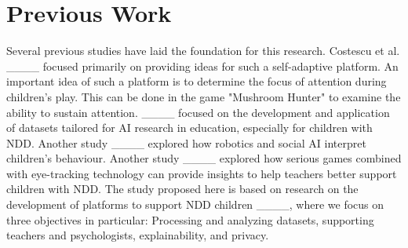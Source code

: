 \section{Previous Work}
Several previous studies have laid the foundation for this research. Costescu et al. ____ focused primarily on providing ideas for such a self-adaptive platform. An important idea of such a platform is to determine the focus of attention during children's play. This can be done in the game "Mushroom Hunter" to examine the ability to sustain attention. ____ focused on the development and application of datasets tailored for AI research in education, especially for children with NDD. Another study ____ explored how robotics and social AI interpret children's behaviour. Another study ____ explored how serious games combined with eye-tracking technology can provide insights to help teachers better support children with NDD. The study proposed here is based on research on the development of platforms to support NDD children ____, where we focus on three objectives in particular: Processing and analyzing datasets, supporting teachers and psychologists, explainability, and privacy.